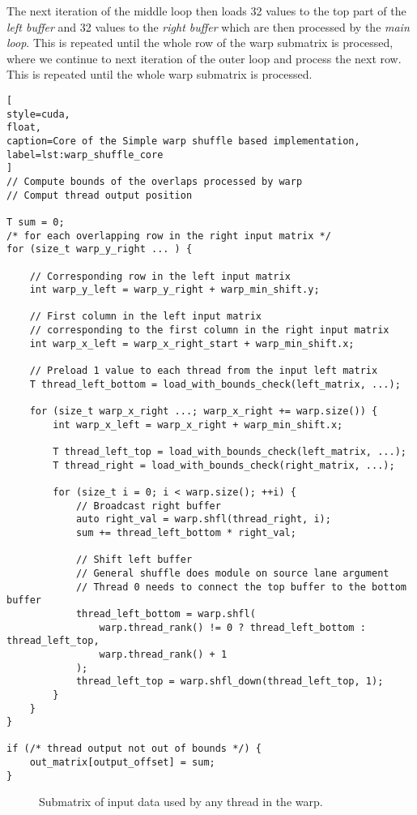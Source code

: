 The next iteration of the middle loop then loads 32 values to the top part of the \textit{left buffer} and 32 values to the \textit{right buffer} which are then processed by the \textit{main loop}. This is repeated until the whole row of the warp submatrix is processed, where we continue to next iteration of the outer loop and process the next row. This is repeated until the whole warp submatrix is processed.
\begin{lstlisting}[
style=cuda,
float,
caption=Core of the Simple warp shuffle based implementation,
label=lst:warp_shuffle_core
]
// Compute bounds of the overlaps processed by warp
// Comput thread output position

T sum = 0;
/* for each overlapping row in the right input matrix */
for (size_t warp_y_right ... ) {

	// Corresponding row in the left input matrix
	int warp_y_left = warp_y_right + warp_min_shift.y;
	
	// First column in the left input matrix 
	// corresponding to the first column in the right input matrix
	int warp_x_left = warp_x_right_start + warp_min_shift.x;
	
	// Preload 1 value to each thread from the input left matrix
	T thread_left_bottom = load_with_bounds_check(left_matrix, ...);
	
	for (size_t warp_x_right ...; warp_x_right += warp.size()) {
		int warp_x_left = warp_x_right + warp_min_shift.x;
		
		T thread_left_top = load_with_bounds_check(left_matrix, ...);
		T thread_right = load_with_bounds_check(right_matrix, ...);
		
		for (size_t i = 0; i < warp.size(); ++i) {
			// Broadcast right buffer
			auto right_val = warp.shfl(thread_right, i);
			sum += thread_left_bottom * right_val;
			
			// Shift left buffer
			// General shuffle does module on source lane argument
			// Thread 0 needs to connect the top buffer to the bottom buffer
			thread_left_bottom = warp.shfl(
				warp.thread_rank() != 0 ? thread_left_bottom : thread_left_top,
				warp.thread_rank() + 1
			);
			thread_left_top = warp.shfl_down(thread_left_top, 1);
		}
	}
}

if (/* thread output not out of bounds */) {
	out_matrix[output_offset] = sum;
}
\end{lstlisting}



\begin{figure}[ht]
	\centering
	\def\svgwidth{0.5\textwidth}
	
	\caption{Submatrix of input data used by any thread in the warp.}
	\label{fig:common_submatrix}
\end{figure}

